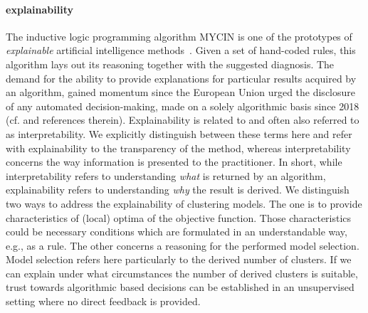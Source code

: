 \paragraph{explainability} 
The inductive logic programming algorithm MYCIN is one of the prototypes of \emph{explainable} artificial intelligence methods~\citep{fagan1980computer}. Given a set of hand-coded rules, this algorithm lays out its reasoning together with the suggested diagnosis. 
The demand for the ability to provide explanations for particular results acquired by an algorithm, gained momentum since the European Union urged the disclosure of any automated decision-making, made on a solely algorithmic basis since 2018 (cf.\@ \cite{doshi2017towards} and references therein). Explainability is related to and often also referred to as interpretability. We explicitly distinguish between these terms here and refer with explainability to the transparency of the method, whereas interpretability concerns the way information is presented to the practitioner. In short, while interpretability refers to understanding \emph{what} is returned by an algorithm, explainability refers to understanding \emph{why} the result is derived. We distinguish two ways to address the explainability of clustering models. The one is to provide characteristics of (local) optima of the objective function. Those characteristics could be necessary conditions which are formulated in an understandable way, e.g., as a rule. The other concerns a reasoning for the performed model selection. Model selection refers here particularly to the derived number of clusters. If we can explain under what circumstances the number of derived clusters is suitable, trust towards algorithmic based decisions can be established in an unsupervised setting where no direct feedback is provided.
